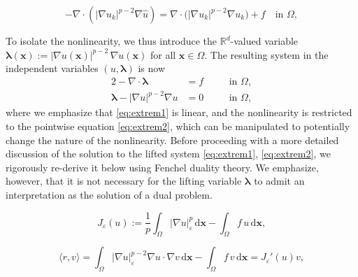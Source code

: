 \documentclass[10pt,a4paper]{amsart}
\newcommand{\bs}[1]{\ensuremath{\boldsymbol{#1}}}
\begin{document}
\begin{equation}
\label{eq:picard-intro}
-\nabla\cdot\left(|\nabla u_k|^{p-2}\nabla \hat u\right) = \nabla\cdot\bigl(|\nabla u_k|^{p-2}\nabla u_k\bigr) + f
\quad\text{in }\Omega,
\end{equation}

To isolate the nonlinearity, we thus introduce the $\mathbb R^d$-valued variable  $\bs\lambda(\bs x):= |\nabla u(\bs x)|^{p-2}\, \nabla u(\bs x) $ for all $\bs x\in\Omega$.
The resulting system in the independent variables $(u,\bs\lambda)$ is now
\begin{alignat}{2}
-\nabla\!\cdot\!\bs\lambda &= f \quad&&\text{in }\Omega,\label{eq:extrem1}\\
\bs\lambda - |\nabla u|^{p-2}\nabla u &= 0 \quad&&\text{in }\Omega,\label{eq:extrem2}
\end{alignat}
where we emphasize that \eqref{eq:extrem1} is linear, and the nonlinearity is restricted to the pointwise equation \eqref{eq:extrem2}, which can be manipulated to potentially change the nature of the nonlinearity. Before proceeding with a more detailed discussion of the solution to the lifted system \eqref{eq:extrem1}, \eqref{eq:extrem2}, we rigorously re-derive it below using Fenchel duality theory. We emphasize, however, that it is not necessary for the lifting variable $\bs\lambda$ to admit an interpretation as the solution of a dual problem.

\begin{equation}\label{eq:J-eps}
  J_\varepsilon(u):=\frac1p\int_\Omega|\nabla u|_\varepsilon^{p}\,\mathrm{d}\bs x-\int_\Omega f\,u\,\mathrm{d}\bs x,
\end{equation}

\begin{equation}\label{eq:residual-is-derivative}
  \langle r,v\rangle
  =\int_\Omega |\nabla u|_\varepsilon^{p-2}\nabla u\cdot\nabla v\,\mathrm{d}\bs x
   -\int_\Omega f\,v\,\mathrm{d}\bs x
  = J_\varepsilon'(u)v,
\end{equation}
\end{document}

